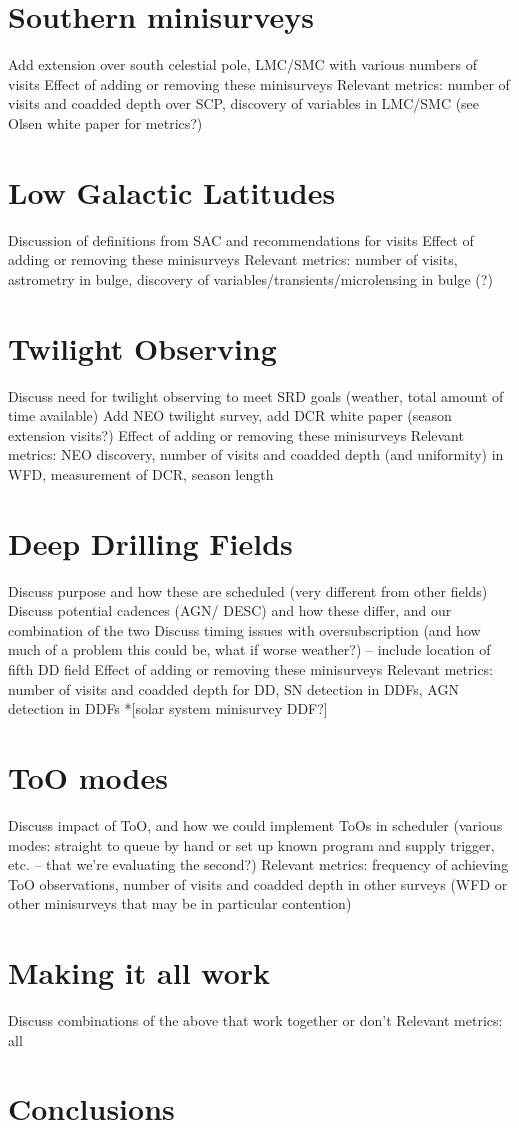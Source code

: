 \section{Southern minisurveys}
Add extension over south celestial pole, LMC/SMC with various numbers of visits
Effect of adding or removing these minisurveys
Relevant metrics: number of visits and coadded depth over SCP, discovery of variables in LMC/SMC (see Olsen white paper for metrics?)

\section{Low Galactic Latitudes}
Discussion of definitions from SAC and recommendations for visits
Effect of adding or removing these minisurveys
Relevant metrics: number of visits, astrometry in bulge, discovery of variables/transients/microlensing in bulge (?)

\section{Twilight Observing}
Discuss need for twilight observing to meet SRD goals (weather, total amount of time available)
Add NEO twilight survey, add DCR white paper (season extension visits?)
Effect of adding or removing these minisurveys
Relevant metrics: NEO discovery, number of visits and coadded depth (and uniformity) in WFD, measurement of DCR, season length

\section{Deep Drilling Fields}
Discuss purpose and how these are scheduled (very different from other fields)
Discuss potential cadences (AGN/ DESC) and how these differ, and our combination of the two
Discuss timing issues with oversubscription (and how much of a problem this could be, what if worse weather?) -- include location of fifth DD field
Effect of adding or removing these minisurveys
Relevant metrics: number of visits and coadded depth for DD, SN detection in DDFs, AGN detection in DDFs
*[solar system minisurvey DDF?]

\section{ToO modes}
Discuss impact of ToO, and how we could implement ToOs in scheduler (various modes: straight to queue by hand or set up known program and supply trigger, etc. -- that we're evaluating the second?)
Relevant metrics: frequency of achieving ToO observations, number of visits and coadded depth in other surveys (WFD or other minisurveys that may be in particular contention)

\section{Making it all work}
Discuss combinations of the above that work together or don't 
Relevant metrics: all

\section{Conclusions}